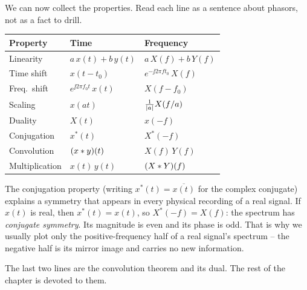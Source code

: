 We can now collect the properties. Read each line as a sentence about phasors,
not as a fact to drill.

\begin{center}
\renewcommand{\arraystretch}{1.5}
\begin{tabular}{@{}lll@{}}
\toprule
\textbf{Property} & \textbf{Time} & \textbf{Frequency}\\
\midrule
Linearity      & $a\,x(t)+b\,y(t)$        & $a\,X(f)+b\,Y(f)$\\
Time shift     & $x(t-t_0)$               & $e^{-\jj 2\pi f t_0}\,X(f)$\\
Freq.\ shift   & $e^{\jj 2\pi f_0 t}\,x(t)$ & $X(f-f_0)$\\
Scaling        & $x(at)$                  & $\frac{1}{\lvert a\rvert}X(f/a)$\\
Duality        & $X(t)$                   & $x(-f)$\\
Conjugation    & $x^{*}(t)$               & $X^{*}(-f)$\\
Convolution    & $(x \ast y)(t)$         & $X(f)\,Y(f)$\\
Multiplication & $x(t)\,y(t)$             & $(X \ast Y)(f)$\\
\bottomrule
\end{tabular}
\end{center}

The conjugation property (writing $x^{*}(t) = \overline{x(t)}$ for the complex conjugate) explains a symmetry that appears in every physical
recording of a real signal. If $x(t)$ is real, then
$x^{*}(t) = x(t)$, so $X^{*}(-f) = X(f)$: the spectrum has
\emph{conjugate symmetry}. Its magnitude is even and its phase is odd. That is
why we usually plot only the positive-frequency half of a real signal's
spectrum -- the negative half is its mirror image and carries no new
information.

The last two lines are the convolution theorem and its dual. The rest of the
chapter is devoted to them.

